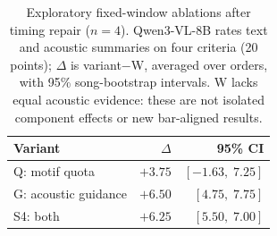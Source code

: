 \begin{table}[t]
\centering
\caption{Exploratory fixed-window ablations after timing repair ($n=4$). Qwen3-VL-8B rates text and acoustic summaries on four criteria (20 points); $\Delta$ is variant$-$W, averaged over orders, with 95\% song-bootstrap intervals. W lacks equal acoustic evidence: these are not isolated component effects or new bar-aligned results.}
\label{tab:harness-exploratory}
\begingroup\small
\setlength{\tabcolsep}{3pt}
\renewcommand{\arraystretch}{1.10}
\begin{tabular*}{\columnwidth}{@{\extracolsep{\fill}}lrr@{}}
\toprule
Variant & $\Delta$ & 95\% CI \\
\midrule
Q: motif quota & $+3.75$ & $[-1.63,\;7.25]$ \\
G: acoustic guidance & $+6.50$ & $[4.75,\;7.75]$ \\
S4: both & $+6.25$ & $[5.50,\;7.00]$ \\
\bottomrule
\end{tabular*}
\endgroup
\end{table}
